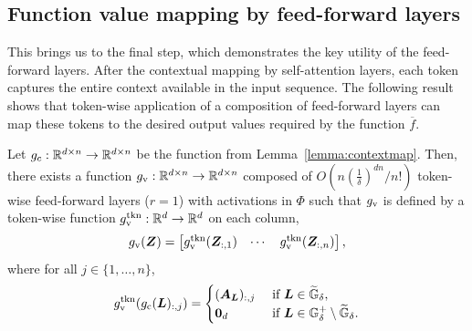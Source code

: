 
\vspace*{-3pt}
\subsection{Function value mapping by feed-forward layers}
\vspace*{-3pt}
\label{sec:ff-value-mapping}
This brings us to the final step, which demonstrates the key utility of the feed-forward layers. After the contextual mapping by self-attention layers, each token captures the entire context available in the input sequence. The following result shows that token-wise application of a composition of feed-forward layers can map these tokens to the desired output values required by the function $\overline{f}$. 

\begin{lemma}
\label{lemma:memorize}
Let $g_c : \mathbb{R}^{d \times n} \to \mathbb{R}^{d\times n}$ be the function from Lemma~\ref{lemma:contextmap}. Then, there exists a function $g_{\rm v}: \mathbb{R}^{d \times n} \to \mathbb{R}^{d \times n}$ composed of $O(n (\frac{1}{\delta})^{dn}/n!)$ token-wise feed-forward layers \textup{($r=1$)} with activations in $\Phi$ such that $g_{\rm v}$ is defined by a token-wise function $g_{\rm v}^{\rm tkn}:\mathbb{R}^d \to \mathbb{R}^d$ on each column,
\begin{equation*}
    g_{\rm v} ({\bm{Z}}) = 
    \begin{bmatrix}
    g_{\rm v}^{\rm tkn} ({\bm{Z}}_{:, 1}) &
    \cdots &
    g_{\rm v}^{\rm tkn} ({\bm{Z}}_{:, n})
    \end{bmatrix},
\end{equation*}
where for all $j \in \{1, \dots, n\}$,
\begin{equation*}
    g_{\rm v}^{\rm tkn}(g_{\rm c}({\bm{L}})_{:,j}) =
    \begin{cases}
        ({\bm{A}}_{{\bm{L}}})_{:,j} & \text{ if } {\bm{L}} \in \widetilde{{\mathbb{G}}}_{\delta},\\
        {\bm{0}}_{d} & \text{ if } {\bm{L}} \in {\mathbb{G}}^+_{\delta} \setminus \widetilde{{\mathbb{G}}}_{\delta}.
    \end{cases}
\end{equation*}
\end{lemma}

